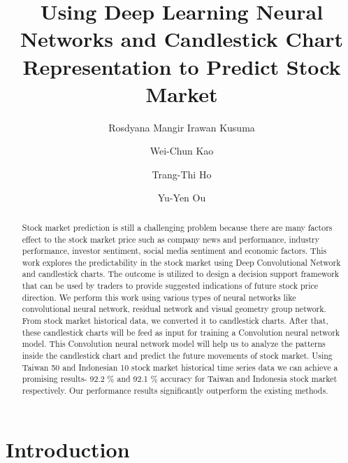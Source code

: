 \documentclass[10pt,twocolumn]{article}
\begin{document}
\title{Using Deep Learning Neural Networks and Candlestick Chart Representation to Predict Stock Market}



\author[1]{Rosdyana Mangir Irawan Kusuma}
\author[2]{Wei-Chun Kao}
\author[3]{Trang-Thi Ho}
\author[1]{Yu-Yen Ou}
\renewcommand\Authands{ and }

\maketitle

\thispagestyle{empty}

\begin{abstract}
Stock market prediction is still a challenging problem because there are many factors effect to the stock market price such as company news and performance, industry performance, investor sentiment, social media sentiment and economic factors. This work explores the predictability in the stock market using Deep Convolutional Network and candlestick charts. The outcome is utilized to design a decision support framework that can be used by traders to provide suggested indications of future stock price direction. We perform this work using various types of neural networks like convolutional neural network, residual network and visual geometry group network. From stock market historical data, we converted it to candlestick charts. After that, these candlestick charts will be feed as input for training a Convolution neural network model. This Convolution neural network model will help us to analyze the patterns inside the candlestick chart and predict the future movements of stock market. Using Taiwan 50 and Indonesian 10 stock market historical time series data we can achieve a promising results- 92.2 \% and 92.1 \% accuracy for Taiwan and Indonesia stock market respectively. Our performance results significantly outperform the existing methods.
\end{abstract}


\section{Introduction}
\end{document}
